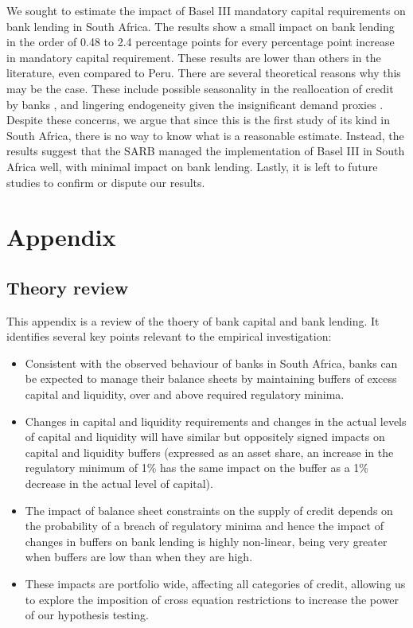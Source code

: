 \documentclass[
  12,
]{article}
\begin{document}
We sought to estimate the impact of Basel III mandatory capital requirements on bank lending in South Africa. The results show a small impact on bank lending in the order of 0.48 to 2.4 percentage points for every percentage point increase in mandatory capital requirement. These results are lower than others in the literature, even compared to Peru. There are several theoretical reasons why this may be the case. These include possible seasonality in the reallocation of credit by banks \citep{aiyar2014international}, and lingering endogeneity given the insignificant demand proxies \citep{fang2020bank}. Despite these concerns, we argue that since this is the first study of its kind in South Africa, there is no way to know what is a reasonable estimate. Instead, the results suggest that the SARB managed the implementation of Basel III in South Africa well, with minimal impact on bank lending. Lastly, it is left to future studies to confirm or dispute our results.

\newpage

\newpage

\hypertarget{appendix}{%
\section{Appendix}\label{appendix}}

\hypertarget{theory-review}{%
\subsection{Theory review}\label{theory-review}}

This appendix is a review of the thoery of bank capital and bank lending. It identifies several key points relevant to the empirical investigation:

\begin{itemize}
    \item Consistent with the observed behaviour of banks in South Africa, banks can be expected to manage their balance sheets by maintaining buffers of excess capital and liquidity, over and above required regulatory minima.
    \item Changes in capital and liquidity requirements and changes in the actual levels of capital and liquidity will have similar but oppositely signed impacts on capital and liquidity buffers (expressed as an asset share, an increase in the regulatory minimum of 1\% has the same impact on the buffer as a 1\% decrease in the actual level of capital). 
    \item The impact of balance sheet constraints on the supply of credit depends on the probability of a breach of regulatory minima and hence the impact of changes in buffers on bank lending is highly non-linear, being very greater when buffers are low than when they are high. 
    \item These impacts are portfolio wide, affecting all categories of credit, allowing us to explore the imposition of cross equation restrictions to increase the power of our hypothesis testing.  
\end{itemize}
\end{document}

